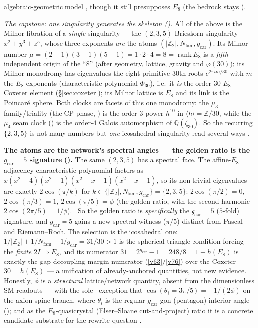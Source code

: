 \documentclass[11pt,a4paper]{article}
\newcommand{\gcar}{g_{\mathrm{car}}}
\newcommand{\Nfam}{N_{\mathrm{fam}}}
\newcommand{\Z}{\mathbb Z}
\begin{document}
\begin{keybox}
algebraic-geometric model \mC, though it still presupposes $E_8$ (the bedrock stays \mO).
\par\smallskip\noindent\emph{The capstone: one singularity generates the skeleton
().} All of the above is the Milnor fibration of a \emph{single}
singularity --- the $(2,3,5)$ Brieskorn singularity $x^2+y^3+z^5$, whose three exponents \emph{are} the atoms
$(|\Z_2|,\Nfam,\gcar)$. Its Milnor number $\mu=(2{-}1)(3{-}1)(5{-}1)=1{\cdot}2{\cdot}4=8=\operatorname{rank}E_8$
is a \emph{fifth} independent origin of the ``$8$'' (after geometry, lattice, gravity and $\varphi(30)$);
its Milnor monodromy has eigenvalues the eight primitive $30$th roots $e^{2\pi i m/30}$ with $m$ the $E_8$
exponents (characteristic polynomial $\Phi_{30}$), i.e.\ it \emph{is} the order-$30$ $E_8$ Coxeter element
(\S\ref{sec:coxeter}); its Milnor lattice is $E_8$ and its link is the Poincar\'e sphere. Both clocks are
facets of this one monodromy: the $\mu_3$ family/triality (the CP phase, )
is the order-$3$ power $h^{10}$ in $\langle h\rangle=\Z/30$, while the $\mu_4$ seam clock
() is the order-$4$ Galois automorphism of $\mathbb Q(\zeta_{30})$. So the
recurring $\{2,3,5\}$ is not many numbers but \emph{one} icosahedral singularity read several ways \mE.
\end{keybox}

\par\smallskip\noindent\textbf{The atoms are the network's spectral angles --- the golden ratio is the
$\gcar{=}5$ signature ().} The same $(2,3,5)$ has a spectral face. The
affine-$E_8$ adjacency characteristic polynomial factors as $x(x^2{-}4)(x^2{-}1)(x^2{-}x{-}1)(x^2{+}x{-}1)$, so its
non-trivial eigenvalues are exactly $2\cos(\pi/k)$ for $k\in\{|\Z_2|,\Nfam,\gcar\}=\{2,3,5\}$: $2\cos(\pi/2){=}0$,
$2\cos(\pi/3){=}1$, $2\cos(\pi/5){=}\phi$ (the golden ratio, with the second harmonic $2\cos(2\pi/5){=}1/\phi$).
\mE\ So the golden ratio is \emph{specifically} the $\gcar{=}5$ ($5$-fold) signature, and $\gcar{=}5$ gains a new
spectral witness ($\pi/5$) distinct from Pascal and Riemann--Roch. The selection is the icosahedral one:
$1/|\Z_2|{+}1/\Nfam{+}1/\gcar=31/30>1$ is the spherical-triangle condition forcing the \emph{finite}
$2I\Rightarrow E_8$, and its numerator $31=2^{\gcar}{-}1=248/8=1{+}h(E_8)$ is exactly the gap-decoupling margin
numerator (\vref{v63}/\vref{v76}) over the Coxeter $30=h(E_8)$ --- a unification of already-anchored quantities,
not new evidence. Honestly, $\phi$ is a \emph{structural} lattice/network quantity, absent from the dimensionless
SM readouts --- with the sole \mC\ exception that $\cos(\theta_i{=}3\pi/5)=-1/(2\phi)$ on the axion spine branch,
where $\theta_i$ is the regular $\gcar$-gon (pentagon) interior angle (); and
as the $E_8$-quasicrystal (Elser--Sloane cut-and-project) ratio it is a concrete candidate substrate
for the rewrite question \mC.
\end{document}
